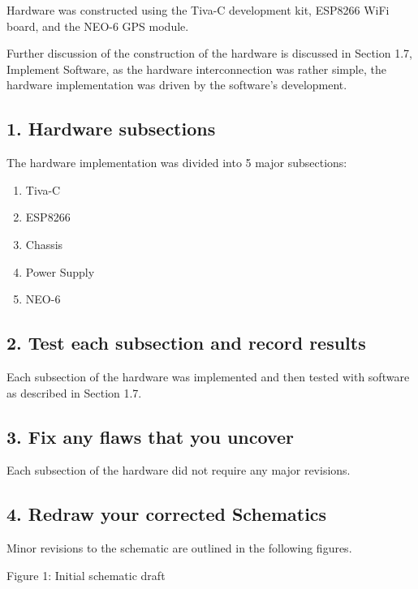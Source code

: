 \documentclass{article}
\begin{document}
Hardware was constructed using the Tiva-C development kit\cite{Tiva-C}, ESP8266 WiFi board\cite{ESP8266}, and the NEO-6 GPS module\cite{neo-6}.

Further discussion of the construction of the hardware is discussed in Section 1.7, Implement Software, as the hardware interconnection was rather simple, the hardware implementation was driven by the software's development.

\subsection*{1. Hardware subsections}
The hardware implementation was divided into 5 major subsections:
\begin{enumerate}
  \item Tiva-C
  \item ESP8266
  \item Chassis
  \item Power Supply
  \item NEO-6

\end{enumerate}

\subsection*{2. Test each subsection and record results}

Each subsection of the hardware was implemented and then tested with software as described in Section 1.7.

\subsection*{3. Fix any flaws that you uncover}

Each subsection of the hardware did not require any major revisions.

\subsection*{4. Redraw your corrected Schematics}

Minor revisions to the schematic are outlined in the following figures.

\clearpage

\begin{figure}


\end{figure}
Figure 1: Initial schematic draft
\end{document}
